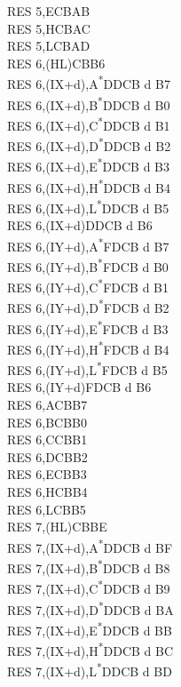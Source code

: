 \documentclass[oneside,a4paper]{book}
\begin{document}
\begin{multicols}{3}
{\begin{tabbing}
RES 5,E\>CBAB\\
RES 5,H\>CBAC\\
RES 5,L\>CBAD\\
RES 6,(HL)\>CBB6\\
RES 6,(IX+d),A\textsuperscript{*}\>DDCB d B7\\
RES 6,(IX+d),B\textsuperscript{*}\>DDCB d B0\\
RES 6,(IX+d),C\textsuperscript{*}\>DDCB d B1\\
RES 6,(IX+d),D\textsuperscript{*}\>DDCB d B2\\
RES 6,(IX+d),E\textsuperscript{*}\>DDCB d B3\\
RES 6,(IX+d),H\textsuperscript{*}\>DDCB d B4\\
RES 6,(IX+d),L\textsuperscript{*}\>DDCB d B5\\
RES 6,(IX+d)\>DDCB d B6\\
RES 6,(IY+d),A\textsuperscript{*}\>FDCB d B7\\
RES 6,(IY+d),B\textsuperscript{*}\>FDCB d B0\\
RES 6,(IY+d),C\textsuperscript{*}\>FDCB d B1\\
RES 6,(IY+d),D\textsuperscript{*}\>FDCB d B2\\
RES 6,(IY+d),E\textsuperscript{*}\>FDCB d B3\\
RES 6,(IY+d),H\textsuperscript{*}\>FDCB d B4\\
RES 6,(IY+d),L\textsuperscript{*}\>FDCB d B5\\
RES 6,(IY+d)\>FDCB d B6\\
RES 6,A\>CBB7\\
RES 6,B\>CBB0\\
RES 6,C\>CBB1\\
RES 6,D\>CBB2\\
RES 6,E\>CBB3\\
RES 6,H\>CBB4\\
RES 6,L\>CBB5\\
RES 7,(HL)\>CBBE\\
RES 7,(IX+d),A\textsuperscript{*}\>DDCB d BF\\
RES 7,(IX+d),B\textsuperscript{*}\>DDCB d B8\\
RES 7,(IX+d),C\textsuperscript{*}\>DDCB d B9\\
RES 7,(IX+d),D\textsuperscript{*}\>DDCB d BA\\
RES 7,(IX+d),E\textsuperscript{*}\>DDCB d BB\\
RES 7,(IX+d),H\textsuperscript{*}\>DDCB d BC\\
RES 7,(IX+d),L\textsuperscript{*}\>DDCB d BD\\

\end{tabbing}}
\end{multicols}
\end{document}
